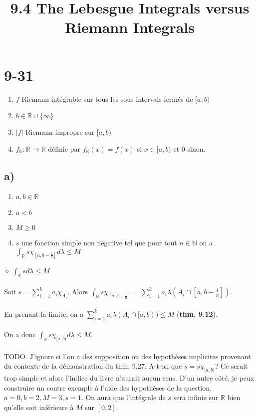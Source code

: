 \documentclass[a4paper,10pt]{article}
\title{9.4 The Lebesgue Integrals versus Riemann Integrals}
\begin{document}
\maketitle

\section*{9-31}
\begin{enumerate}
	\item $f$ Riemann intégrable sur tous les sous-intervals fermés de $[a,b)$
	\item $b \in \mathbb{R} \cup \{\infty\}$
	\item $|f|$ Riemann impropre sur $[a,b)$
	\item $f_\mathbb{R} : \mathbb{R} \rightarrow \mathbb{R}$ définie par $f_\mathbb{R} (x) = f(x)$ si $x \in [a,b)$ et $0$ sinon.
\end{enumerate}
\subsection*{a)}
\begin{enumerate}
 \item $a,b \in \mathbb{R}$
 \item $a < b$
 \item $M \geq 0$
 \item $s$ une fonction simple non négative tel que pour tout $n \in \mathbb{N}$ on a $\int_\mathbb{R} s \chi_{[a, b - \frac{1}{n}]} d\lambda \leq M$
\end{enumerate}
$\diamond$ \textbf{$\int_\mathbb{R} s d\lambda \leq M$}
\\
\\
Soit $s = \sum_{i=1}^k a_i \chi_{A_i}$. Alors $\int_\mathbb{R} s \chi_{[a,b-\frac{1}{n}]} = \sum_{i=1}^k a_i \lambda (A_i \cap [a,b-\frac{1}{n}])$.
\\
\\
En prenant la limite, on a $\sum_{i=1}^k a_i \lambda (A_i \cap [a,b)) \leq M$ (\textbf{thm. 9.12}). 
\\
\\
On a donc $\int_\mathbb{R} s \chi_{[a,b)} d\lambda \leq M$. 
\\
\\
TODO. J'ignore si l'on a des supposition ou des hypothèses implicites provenant du contexte de la démonstration du thm. 9.27. A-t-on que $s = s \chi_{[a,b)}$? Ce serait trop simple et alors l'indice du livre n'aurait aucun sens. D'un autre côté, je peux construire un contre exemple à l'aide des hypothèses de la question. $a = 0, b = 2, M = 3, s = 1$. On aura que l'intégrale de $s$ sera infinie sur $\mathbb{R}$ bien qu'elle soit inférieure à $M$ sur $[0,2]$. 
\end{document}
